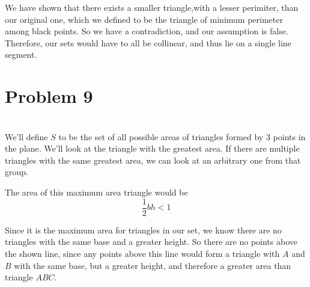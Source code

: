 \documentclass[12pt]{article}
\begin{document}
We have shown that there exists a smaller triangle,with a lesser perimiter, than our original one, which we defined to be the triangle of minimum perimeter among black points. So we have a contradiction, and our assumption is false. Therefore, our sets would have to all be collinear, and thus lie on a single line segment.

\section*{Problem 9}
\\

We'll define $S$ to be the set of all possible areas of triangles formed by 3 points in the plane. We'll look at the triangle with the greatest area. If there are multiple triangles with the same greatest area, we can look at an arbitrary one from that group.

\begin{center}
\end{center}

The area of this maximum area triangle would be
\[\frac{1}{2}bh < 1\]

Since it is the maximum area for triangles in our set, we know there are no triangles with the same base and a greater height. So there are no points above the shown line, since any points above this line would form a triangle with $A$ and $B$ with the same base, but a greater height, and therefore a greater area than triangle $ABC$.
\end{document}

